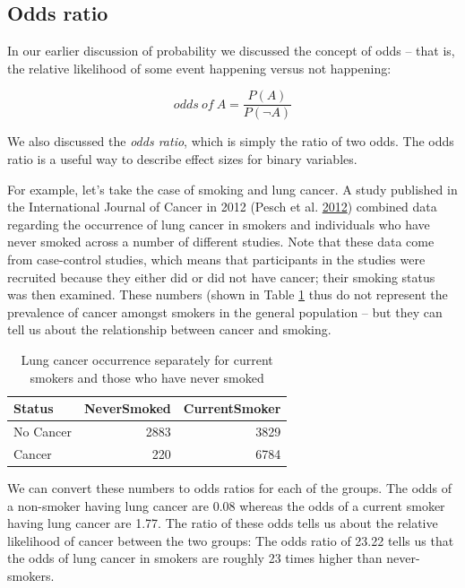 \documentclass[12pt,]{book}
\theoremstyle{definition}
\theoremstyle{definition}
\theoremstyle{definition}
\theoremstyle{remark}
\begin{document}
\hypertarget{odds-ratio}{%
\subsection{Odds ratio}\label{odds-ratio}}

In our earlier discussion of probability we discussed the concept of odds -- that is, the relative likelihood of some event happening versus not happening:

\[
odds\ of\ A = \frac{P(A)}{P(\neg A)}
\]

We also discussed the \emph{odds ratio}, which is simply the ratio of two odds. The odds ratio is a useful way to describe effect sizes for binary variables.

For example, let's take the case of smoking and lung cancer. A study published in the International Journal of Cancer in 2012 (Pesch et al. \protect\hyperlink{ref-pesc:kend:gust:2012}{2012}) combined data regarding the occurrence of lung cancer in smokers and individuals who have never smoked across a number of different studies. Note that these data come from case-control studies, which means that participants in the studies were recruited because they either did or did not have cancer; their smoking status was then examined. These numbers (shown in Table \ref{tab:smokingData} thus do not represent the prevalence of cancer amongst smokers in the general population -- but they can tell us about the relationship between cancer and smoking.

\begin{table}

\caption{\label{tab:smokingData}Lung cancer occurrence separately for current smokers and those who have never smoked}
\centering
\begin{tabular}[t]{l|r|r}
\hline
Status & NeverSmoked & CurrentSmoker\\
\hline
No Cancer & 2883 & 3829\\
\hline
Cancer & 220 & 6784\\
\hline
\end{tabular}
\end{table}

We can convert these numbers to odds ratios for each of the groups. The odds of a non-smoker having lung cancer are 0.08 whereas the odds of a current smoker having lung cancer are 1.77. The ratio of these odds tells us about the relative likelihood of cancer between the two groups: The odds ratio of 23.22 tells us that the odds of lung cancer in smokers are roughly 23 times higher than never-smokers.
\end{document}
